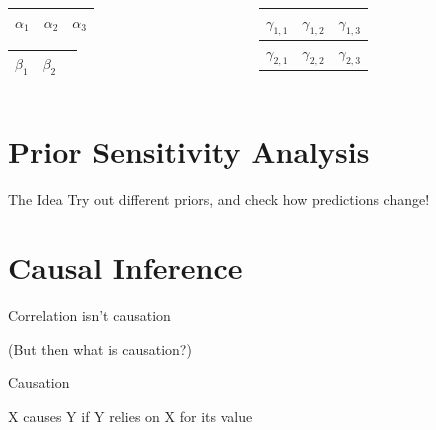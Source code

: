 \documentclass[aspectratio=169,xcolor=svgnames]{beamer}
\begin{document}
\begin{frame}
  \begin{columns}
    \begin{column}{0.5\textwidth}
    \begin{tabular}{|c|c|c|}
        \hline
        $\alpha_1$ & $\alpha_2$ & $\alpha_3$ \\
        \hline
    \end{tabular}

    \begin{tabular}{|c|c|c|}
        \hline
        $\beta_1$ & $\beta_2$  \\
        \hline
    \end{tabular}
    \end{column}


    \begin{column}{0.5\textwidth}
    \begin{tabular}{|c|c|c|}
        \hline
        $\gamma_{1,1}$ & $\gamma_{1,2}$ & $\gamma_{1,3}$ \\
        \hline
        $\gamma_{2,1}$ & $\gamma_{2,2}$ & $\gamma_{2,3}$ \\
        \hline
    \end{tabular}
    \end{column}
  \end{columns}
\end{frame}

\section{Prior Sensitivity Analysis}

\begin{frame}{The Idea}
  \center
  Try out different priors, and check how predictions change!
\end{frame}

\section{Causal Inference}

\begin{frame}
  \center
  \huge
  Correlation isn't causation

  \footnotesize
  (But then what is causation?)
\end{frame}

\begin{frame}
  \center
  \huge
  Causation

  \small
  X causes Y if Y relies on X for its value
\end{frame}
\end{document}

